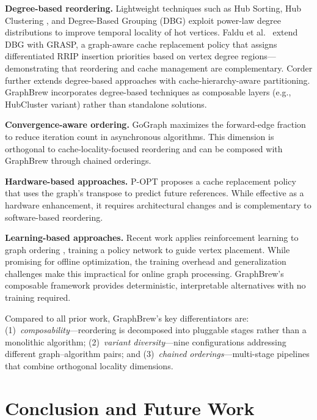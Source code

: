 \documentclass[sigconf, nonacm]{acmart}
\begin{document}
\textbf{Degree-based reordering.} Lightweight techniques such as Hub Sorting, Hub Clustering \cite{balaji_when_2018}, and Degree-Based Grouping (DBG) \cite{faldu_closer_2020} exploit power-law degree distributions to improve temporal locality of hot vertices. Faldu et al.~\cite{faldu_domain-specialized_2020} extend DBG with GRASP, a graph-aware cache replacement policy that assigns differentiated RRIP insertion priorities based on vertex degree regions---demonstrating that reordering and cache management are complementary. Corder \cite{chen_workload_2021} further extends degree-based approaches with cache-hierarchy-aware partitioning. GraphBrew incorporates degree-based techniques as composable layers (e.g., HubCluster variant) rather than standalone solutions.

\textbf{Convergence-aware ordering.} GoGraph \cite{zhou_fast_2024} maximizes the forward-edge fraction to reduce iteration count in asynchronous algorithms. This dimension is orthogonal to cache-locality-focused reordering and can be composed with GraphBrew through chained orderings.

\textbf{Hardware-based approaches.} P-OPT \cite{balaji_p-opt_2021} proposes a cache replacement policy that uses the graph's transpose to predict future references. While effective as a hardware enhancement, it requires architectural changes and is complementary to software-based reordering.

\textbf{Learning-based approaches.} Recent work applies reinforcement learning to graph ordering \cite{zhao_graph_2017}, training a policy network to guide vertex placement. While promising for offline optimization, the training overhead and generalization challenges make this impractical for online graph processing. GraphBrew's composable framework provides deterministic, interpretable alternatives with no training required.

Compared to all prior work, GraphBrew's key differentiators are: (1)~\emph{composability}---reordering is decomposed into pluggable stages rather than a monolithic algorithm; (2)~\emph{variant diversity}---nine configurations addressing different graph--algorithm pairs; and (3)~\emph{chained orderings}---multi-stage pipelines that combine orthogonal locality dimensions.


\section{Conclusion and Future Work}
\label{sec:conclusion}
\end{document}
